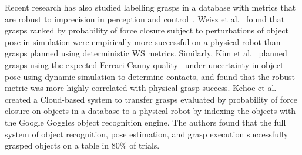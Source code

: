 Recent research has also studied labelling grasps in a database with metrics that are robust to imprecision in perception and control~\cite{brook2011collaborative, mahler2015gp, zheng2005}.
Weisz et al.~\cite{weisz2012pose} found that grasps ranked by probability of force closure subject to perturbations of object pose in simulation were empirically more successful on a physical robot than grasps planned using deterministic WS metrics. 
Similarly, Kim et al.~\cite{kim2012physically} planned grasps using the expected Ferrari-Canny quality~\cite{ferrari1992} under uncertainty in object pose using dynamic simulation to determine contacts, and found that the robust metric was more highly correlated with physical grasp success.
Kehoe et al.~\cite{kehoe2013cloud} created a Cloud-based system to transfer grasps evaluated by probability of force closure on objects in a database to a physical robot by indexing the objects with the Google Goggles object recognition engine.
The authors found that the full system of object recognition, pose estimation, and grasp execution successfully grasped objects on a table in 80\% of trials.

